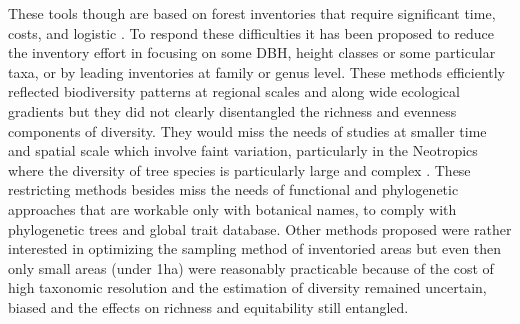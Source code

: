\documentclass[fleqn,10pt]{ArtEcoFoG} %
\begin{document}
These tools though are based on forest inventories that require
significant time, costs, and logistic \citep{Feeley2011}. To respond
these difficulties it has been proposed to reduce the inventory effort
in focusing on some DBH, height classes or some particular taxa, or by
leading inventories at family or genus level. These methods efficiently
reflected biodiversity patterns at regional scales and along wide
ecological gradients
\citep{Steege2000, Higgins2004, Rejou-Mechain2011, Pos2014} but they did
not clearly disentangled the richness and evenness components of
diversity. They would miss the needs of studies at smaller time and
spatial scale which involve faint variation, particularly in the
Neotropics where the diversity of tree species is particularly large and
complex \citetext{\citealp[
]{Guitet2014b}; \citealp{Vellend2008}; \citealp{Prance1994}}. These
restricting methods besides miss the needs of functional and
phylogenetic approaches that are workable only with botanical names, to
comply with phylogenetic trees and global trait database. Other methods
proposed were rather interested in optimizing the sampling method of
inventoried areas \citep{Phillips2003a, Valencia2013} but even then only
small areas (under 1ha) were reasonably practicable because of the cost
of high taxonomic resolution and the estimation of diversity remained
uncertain, biased and the effects on richness and equitability still
entangled.
\end{document}
